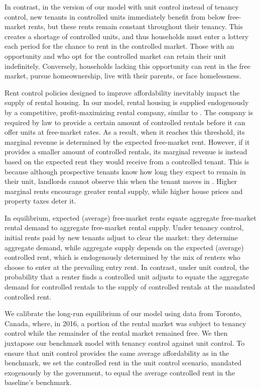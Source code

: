 \documentclass[parskip=full]{article}
\begin{document}
In contrast, in the version of our model with unit control instead of tenancy control, new tenants in controlled units immediately benefit from below free-market rents, but these rents remain constant throughout their tenancy. This creates a shortage of controlled units, and thus households must enter a lottery each period for the chance to rent in the controlled market. Those with an opportunity and who opt for the controlled market can retain their unit indefinitely. Conversely, households lacking this opportunity can rent in the free market, pursue homeownership, live with their parents, or face homelessness.

Rent control policies designed to improve affordability inevitably impact the supply of rental housing. In our model, rental housing is supplied endogenously by a competitive, profit-maximizing rental company, similar to \citet{fallis-1985}. The company is required by law to provide a certain amount of controlled rentals before it can offer units at free-market rates. As a result, when it reaches this threshold, its marginal revenue is determined by the expected free-market rent. However, if it provides a smaller amount of controlled rentals, its marginal revenue is instead based on the expected rent they would receive from a controlled tenant. This is because although prospective tenants know how long they expect to remain in their unit, landlords cannot observe this when the tenant moves in \citep{be-2000}. Higher marginal rents encourage greater rental supply, while higher house prices and property taxes deter it.

In equilibrium, expected (average) free-market rents equate aggregate free-market rental demand to aggregate free-market rental supply. Under tenancy control, initial rents paid by new tenants adjust to clear the market: they determine aggregate demand, while aggregate supply depends on the expected (average) controlled rent, which is endogenously determined by the mix of renters who choose to enter at the prevailing entry rent. In contrast, under unit control, the probability that a renter finds a controlled unit adjusts to equate the aggregate demand for controlled rentals to the supply of controlled rentals at the mandated controlled rent. 

We calibrate the long-run equilibrium of our model using data from Toronto, Canada, where, in 2016, a portion of the rental market was subject to tenancy control while the remainder of the rental market remained free. We then juxtapose our benchmark model with tenancy control against unit control. To ensure that unit control provides the same average affordability as in the benchmark, we set the controlled rent in the unit control scenario, mandated exogenously by the government, to equal the average controlled rent in the baseline's benchmark.
\end{document}
